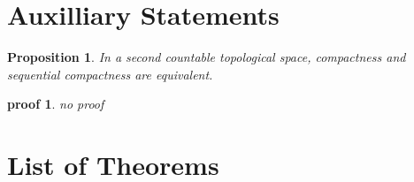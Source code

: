 \documentclass[
  12pt
]{article}
\theoremstyle{break}
\theoremstyle{plain}
\newtheorem{prop}[thm]{Proposition}
\newtheorem*{pf}{proof}
\begin{document}
\cleardoublepage

\appendix

\hypertarget{auxilliary-statements}{%
\section{Auxilliary Statements}\label{auxilliary-statements}}

\begin{prop}
  In a second countable topological space, compactness and sequential compactness are equivalent.
\end{prop}

\begin{pf}
  no proof %
\end{pf}

\section{List of Theorems}

{}
\listoffigures

{}
\printbibliography
\end{document}
